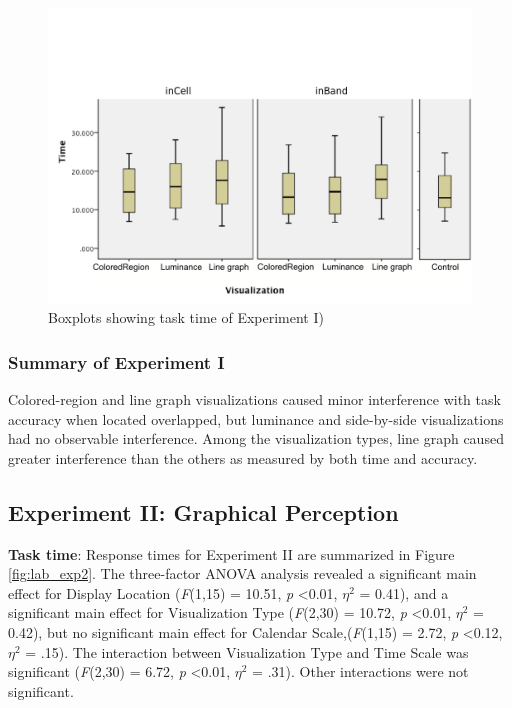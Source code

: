 \documentclass[12pt,oneside]{book}
\begin{document}
\begin{figure}[h]
\centering
\includegraphics[width=\columnwidth]{figures/lab_control}
\caption{Boxplots showing task time of Experiment I)}
\label{fig:lab_control}
\end{figure}

\subsubsection{Summary of Experiment I}

Colored-region and line graph visualizations caused minor interference with task accuracy when located overlapped, but luminance and side-by-side visualizations had no observable interference. Among the visualization types, line graph caused greater interference than the others as measured by both time and accuracy.

\subsection{Experiment II: Graphical Perception}

\textbf{Task time}:
Response times for Experiment II are summarized in Figure \ref{fig:lab_exp2}. The three-factor ANOVA analysis revealed a significant main effect for Display Location (\textit{F}(1,15) = 10.51, \textit{p} \textless 0.01, $\eta^2$ = 0.41), and a significant main effect for Visualization Type (\textit{F}(2,30) = 10.72, \textit{p} \textless 0.01, $\eta^2$ = 0.42), but no significant main effect for Calendar Scale,(\textit{F}(1,15) = 2.72, \textit{p} \textless 0.12, $\eta^2$ = .15). The interaction between Visualization Type and Time Scale was significant (\textit{F}(2,30) = 6.72, \textit{p} \textless 0.01, $\eta^2$ = .31). Other interactions were not significant.
\end{document}
